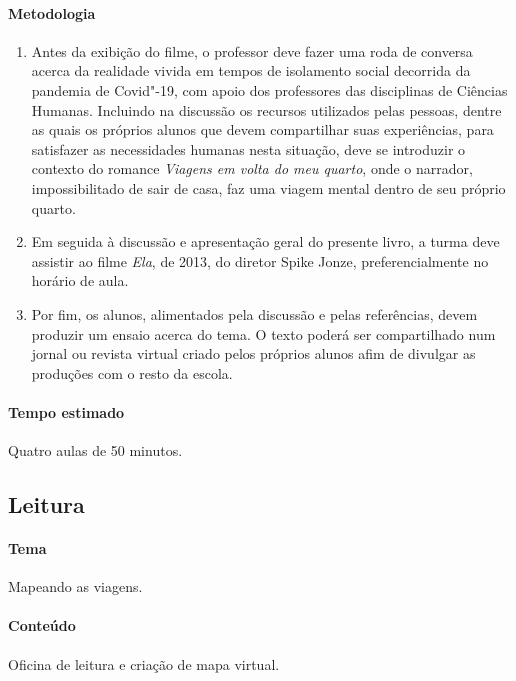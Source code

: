 \documentclass[12pt]{extarticle}
\begin{document}
\paragraph{Metodologia}
\begin{enumerate}
	\item
	Antes da exibição do filme, o professor deve fazer uma roda de conversa acerca 
	da realidade vivida em tempos de isolamento social decorrida da pandemia 
	de Covid"-19, com apoio dos professores das disciplinas de Ciências Humanas. 
	Incluindo na discussão os recursos utilizados pelas
	pessoas, dentre as quais os próprios alunos que devem compartilhar suas
	experiências, para satisfazer as necessidades humanas nesta situação, 
	deve se introduzir o contexto do romance \emph{Viagens em volta do meu quarto},
	onde o narrador, impossibilitado de sair de casa, faz uma viagem 
	mental dentro de seu próprio quarto. 

	\item
	Em seguida à discussão e apresentação geral do presente livro, a turma deve assistir 
	ao filme \emph{Ela}, de 2013, do diretor Spike Jonze, preferencialmente no horário de aula. 
	\item
	Por fim, os alunos, alimentados pela discussão e pelas referências, devem produzir 
	um ensaio acerca do tema. O texto poderá ser compartilhado num jornal ou revista
	virtual criado pelos próprios alunos afim de divulgar as produções 
	com o resto da escola.
\end{enumerate}

\paragraph{Tempo estimado} Quatro aulas de 50 minutos.


\subsection{Leitura}

\paragraph{Tema} Mapeando as viagens.

\paragraph{Conteúdo} Oficina de leitura e criação de mapa virtual.
\end{document}
